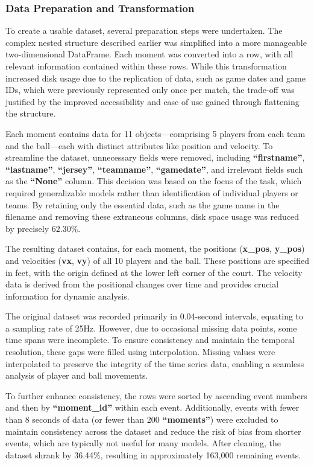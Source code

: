 \subsubsection{Data Preparation and Transformation}
\label{sect:data-prep}

To create a usable dataset, several preparation steps were undertaken. The complex nested structure described earlier was simplified into a more manageable two-dimensional DataFrame. Each moment was converted into a row, with all relevant information contained within these rows. While this transformation increased disk usage due to the replication of data, such as game dates and game IDs, which were previously represented only once per match, the trade-off was justified by the improved accessibility and ease of use gained through flattening the structure.

Each moment contains data for 11 objects—comprising 5 players from each team and the ball—each with distinct attributes like position and velocity. To streamline the dataset, unnecessary fields were removed, including \textbf{``firstname''}, \textbf{``lastname''}, \textbf{``jersey''}, \textbf{``teamname''}, \textbf{``gamedate''}, and irrelevant fields such as the \textbf{``None''} column. This decision was based on the focus of the task, which required generalizable models rather than identification of individual players or teams. By retaining only the essential data, such as the game name in the filename and removing these extraneous columns, disk space usage was reduced by precisely \(62.30\%\).

The resulting dataset contains, for each moment, the positions (\textbf{x\_pos}, \textbf{y\_pos}) and velocities (\textbf{vx}, \textbf{vy}) of all 10 players and the ball. These positions are specified in feet, with the origin defined at the lower left corner of the court. The velocity data is derived from the positional changes over time and provides crucial information for dynamic analysis.

The original dataset was recorded primarily in 0.04-second intervals, equating to a sampling rate of 25Hz. However, due to occasional missing data points, some time spans were incomplete. To ensure consistency and maintain the temporal resolution, these gaps were filled using interpolation. Missing values were interpolated to preserve the integrity of the time series data, enabling a seamless analysis of player and ball movements. 

To further enhance consistency, the rows were sorted by ascending event numbers and then by \textbf{``moment\_id''} within each event. Additionally, events with fewer than 8 seconds of data (or fewer than 200 \textbf{``moments''}) were excluded to maintain consistency across the dataset and reduce the risk of bias from shorter events, which are typically not useful for many models. After cleaning, the dataset shrank by 36.44\%, resulting in approximately 163,000 remaining events.

